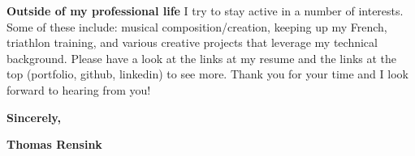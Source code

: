 \documentclass[13pt, a4paper]{awesome-cv}
\begin{document}
\begin{cvletter}
\textbf{Outside of my professional life} I try to stay active in a number of interests.  Some of these include: musical composition/creation, keeping up my French, triathlon training, and various creative projects that leverage my technical background.  Please have a look at the links at my resume and the links at the top (portfolio, github, linkedin) to see more.  Thank you for your time and I look forward to hearing from you!

\bigskip
\textbf{Sincerely,}

\textbf{Thomas Rensink}



\end{cvletter}


\end{document}
